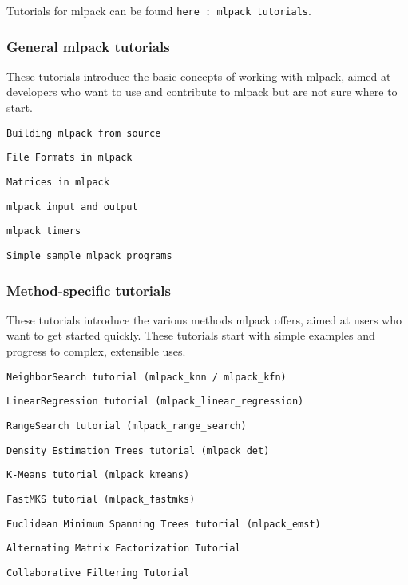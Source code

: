 Tutorials for mlpack can be found {\tt here \+: mlpack tutorials}.

\subsubsection*{General mlpack tutorials}

These tutorials introduce the basic concepts of working with mlpack, aimed at developers who want to use and contribute to mlpack but are not sure where to start.


\begin{DoxyItemize}
\item {\tt Building mlpack from source}
\item {\tt File Formats in mlpack}
\item {\tt Matrices in mlpack}
\item {\tt mlpack input and output}
\item {\tt mlpack timers}
\item {\tt Simple sample mlpack programs}
\end{DoxyItemize}

\subsubsection*{Method-\/specific tutorials}

These tutorials introduce the various methods mlpack offers, aimed at users who want to get started quickly. These tutorials start with simple examples and progress to complex, extensible uses.


\begin{DoxyItemize}
\item {\tt Neighbor\+Search tutorial (mlpack\+\_\+knn / mlpack\+\_\+kfn)}
\item {\tt Linear\+Regression tutorial (mlpack\+\_\+linear\+\_\+regression)}
\item {\tt Range\+Search tutorial (mlpack\+\_\+range\+\_\+search)}
\item {\tt Density Estimation Trees tutorial (mlpack\+\_\+det)}
\item {\tt K-\/\+Means tutorial (mlpack\+\_\+kmeans)}
\item {\tt Fast\+M\+KS tutorial (mlpack\+\_\+fastmks)}
\item {\tt Euclidean Minimum Spanning Trees tutorial (mlpack\+\_\+emst)}
\item {\tt Alternating Matrix Factorization Tutorial}
\item {\tt Collaborative Filtering Tutorial}
\end{DoxyItemize}

